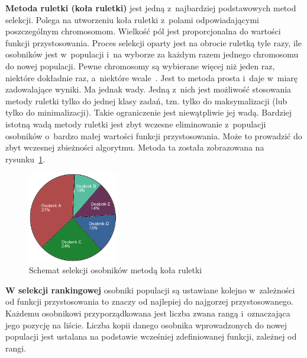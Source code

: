 \documentclass[twoside,12pt]{report}
\begin{document}
\textbf{Metoda ruletki (koła ruletki)} jest jedną z~najbardziej podstawowych metod selekcji. Polega na utworzeniu koła ruletki z~polami odpowiadającymi poszczególnym chromosomom. Wielkość pól jest proporcjonalna do wartości funkcji przystosowania. Proces selekcji oparty jest na obrocie ruletką tyle razy, ile osobników jest w~populacji i~na wyborze za każdym razem jednego chromosomu do nowej populacji. Pewne chromosomy są wybierane więcej niż jeden raz, niektóre dokładnie raz, a~niektóre wcale~\cite{genetyczne-dane=ewo}. Jest to metoda prosta i~daje w~miarę zadowalające wyniki. Ma jednak wady. Jedną z~nich jest możliwość stosowania metody ruletki tylko do jednej klasy zadań, tzn. tylko do maksymalizacji (lub tylko do minimalizacji). Takie ograniczenie jest niewątpliwie jej wadą. Bardziej istotną wadą metody ruletki jest zbyt wczesne eliminowanie z~populacji osobników o~bardzo małej wartości funkcji przystosowania. Może to prowadzić do zbyt wczesnej zbieżności algorytmu. Metoda ta została zobrazowana na rysunku~\ref{fig:selekcja_ruletka}.

\begin{figure}[htbp]
	\centering
	\includegraphics[width=0.35\textwidth]{img/selekcja_roul}
	\caption{Schemat selekcji osobników metodą koła ruletki} 
	\label{fig:selekcja_ruletka}
\end{figure}

\textbf{W selekcji rankingowej} osobniki populacji są ustawiane kolejno w~zależności od funkcji przystosowania to znaczy od najlepiej do najgorzej przystosowanego. Każdemu osobnikowi przyporządkowana jest liczba zwana
rangą i~oznaczająca jego pozycję na liście. Liczba kopii danego osobnika wprowadzonych do nowej populacji jest ustalana na podstawie wcześniej zdefiniowanej funkcji, zależnej od rangi.
\end{document}
